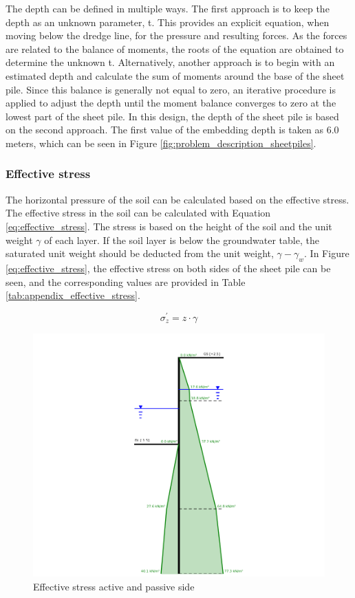 The depth can be defined in multiple ways. The first approach is to keep the depth as an unknown parameter, t. This provides an explicit equation, when moving below the dredge line, for the pressure and resulting forces. As the forces are related to the balance of moments, the roots of the equation are obtained to determine the unknown t. Alternatively, another approach is to begin with an estimated depth and calculate the sum of moments around the base of the sheet pile. Since this balance is generally not equal to zero, an iterative procedure is applied to adjust the depth until the moment balance converges to zero at the lowest part of the sheet pile. In this design, the depth of the sheet pile is based on the second approach. The first value of the embedding depth is taken as 6.0 meters, which can be seen in Figure \ref{fig:problem_description_sheetpiles}.

\subsubsection{Effective stress}

The horizontal pressure of the soil can be calculated based on the effective stress. The effective stress in the soil can be calculated with Equation \ref{eq:effective_stress}. The stress is based on the height of the soil and the unit weight $\gamma$ of each layer. If the soil layer is below the groundwater table, the saturated unit weight should be deducted from the unit weight, $\gamma - \gamma_{w}$. In Figure \ref{eq:effective_stress}, the effective stress on both sides of the sheet pile can be seen, and the corresponding values are provided in Table \ref{tab:appendix_effective_stress}.

\begin{equation}
    \sigma^{'}_{z} = z \cdot \gamma
    \label{eq:effective_stress}
\end{equation}

\begin{figure}[H]
    \centering
    \includegraphics[width=0.90\linewidth]{figures/ch8/effective_stress.png}
    \caption{Effective stress active and passive side}
    \label{fig:effective_stress}
\end{figure}

